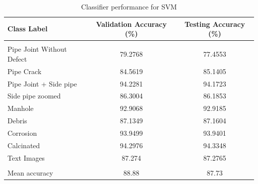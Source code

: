 \documentclass[letterpaper,12pt, onecolumn]{article}%
\begin{document}
\begin{table}[!htbp]
\centering
 \begin{tabular}{ l c c }
 \hline
 Class Label & Validation Accuracy (\%) &  Testing Accuracy (\%)  \\ [0.5ex]
 \hline\hline \\ [-1.5ex]
	Pipe Joint Without Defect & 79.2768 & 77.4553  \\ 
	Pipe Crack & 84.5619 & 85.1405  \\ 
	Pipe Joint + Side pipe  & 94.2281 & 94.1723  \\ [1ex]
	Side pipe zoomed  & 86.3004 & 86.1853  \\ [1ex]
	Manhole  & 92.9068 & 92.9185  \\ [1ex]
 	Debris  & 87.1349 & 87.1604  \\ [1ex]
	Corrosion  & 93.9499 & 93.9401  \\ [1ex]
	Calcinated  & 94.2976 & 94.3348  \\ [1ex]
	Text Images  & 87.274 & 87.2765  \\ [1ex]
\hline \\ [-1.5ex]
	Mean accuracy  & 88.88 & 87.73  \\ [1ex]
 \hline
 \end{tabular}
  	   \caption{Classifier performance for SVM}
       \label{tab:classifier_performance_svm}
\end{table}
\end{document}
